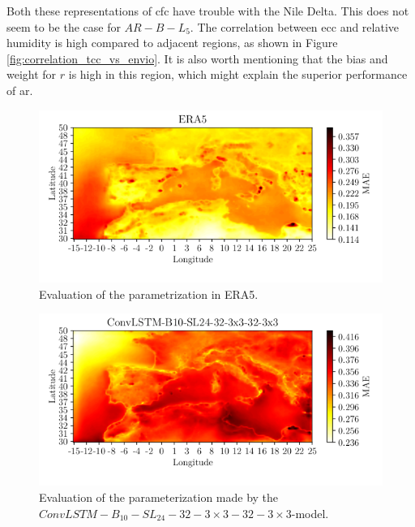 Both these representations of \acrshort{cfc} have trouble with the Nile Delta. This does not seem to be the case for $AR-B-L_5$. The correlation between \acrshort{ecc} and relative humidity is high compared to adjacent regions, as shown in Figure \ref{fig:correlation_tcc_vs_envio}. It is also worth mentioning that the bias and weight for $r$ is high in this region, which might explain the superior performance of \acrshort{ar}.
\begin{figure}[ht]
    \centering
    \includegraphics{python_figs/mae_era_vs_target_test_period_2014_to_2018.png}
    \caption{Evaluation of the parametrization in ERA5.}
    \label{fig:MAE_era}
\end{figure}
\begin{figure}[ht]
    \centering
    \includegraphics{python_figs/mae_convlstm_vs_target_test_period_2014_to_2018.png}
    \caption{Evaluation of the parameterization made by the $ConvLSTM-B_{10}-SL_{24}-32-3\times3-32-3 \times3$-model.}
    \label{fig:MAE_convlstm}
\end{figure}
